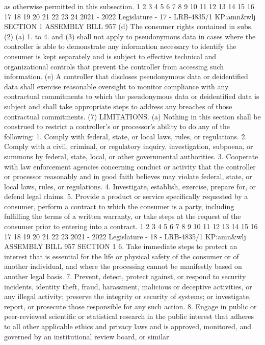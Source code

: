 as otherwise permitted in this subsection.
1
2
3
4
5
6
7
8
9
10
11
12
13
14
15
16
17
18
19
20
21
22
23
24
2021 - 2022 Legislature - 17 - LRB-4835/1
KP:amn&wlj
SECTION 1 ASSEMBLY BILL 957
(d) The consumer rights contained in subs. (2) (a) 1. to 4. and (3) shall not apply
to pseudonymous data in cases where the controller is able to demonstrate any
information necessary to identify the consumer is kept separately and is subject to
effective technical and organizational controls that prevent the controller from
accessing such information.
(e) A controller that discloses pseudonymous data or deidentified data shall
exercise reasonable oversight to monitor compliance with any contractual
commitments to which the pseudonymous data or deidentified data is subject and
shall take appropriate steps to address any breaches of those contractual
commitments.
(7) LIMITATIONS. (a) Nothing in this section shall be construed to restrict a
controller's or processor's ability to do any of the following:
1. Comply with federal, state, or local laws, rules, or regulations.
2. Comply with a civil, criminal, or regulatory inquiry, investigation, subpoena,
or summons by federal, state, local, or other governmental authorities.
3. Cooperate with law enforcement agencies concerning conduct or activity that
the controller or processor reasonably and in good faith believes may violate federal,
state, or local laws, rules, or regulations.
4. Investigate, establish, exercise, prepare for, or defend legal claims.
5. Provide a product or service specifically requested by a consumer, perform
a contract to which the consumer is a party, including fulfilling the terms of a written
warranty, or take steps at the request of the consumer prior to entering into a
contract.
1
2
3
4
5
6
7
8
9
10
11
12
13
14
15
16
17
18
19
20
21
22
23
2021 - 2022 Legislature - 18 - LRB-4835/1
KP:amn&wlj
 ASSEMBLY BILL 957 SECTION 1
6. Take immediate steps to protect an interest that is essential for the life or
physical safety of the consumer or of another individual, and where the processing
cannot be manifestly based on another legal basis.
7. Prevent, detect, protect against, or respond to security incidents, identity
theft, fraud, harassment, malicious or deceptive activities, or any illegal activity;
preserve the integrity or security of systems; or investigate, report, or prosecute
those responsible for any such action.
8. Engage in public or peer-reviewed scientific or statistical research in the
public interest that adheres to all other applicable ethics and privacy laws and is
approved, monitored, and governed by an institutional review board, or similar
